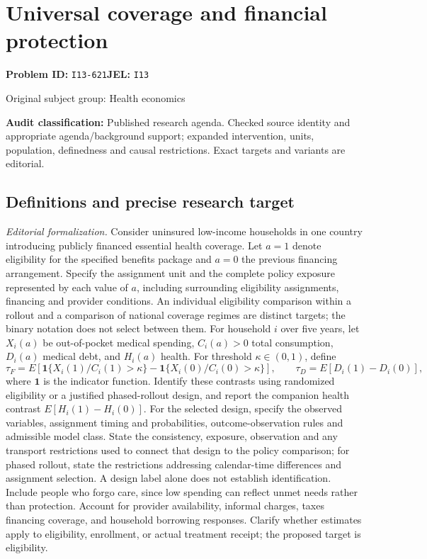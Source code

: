 \documentclass[11pt,a4paper]{article}
\begin{document}
\section*{Universal coverage and financial protection}
\textbf{Problem ID:} \texttt{I13-621}\quad \textbf{JEL:} \texttt{I13}\par
\label{problem:OP-0449}
{\sffamily\small\color{muted}Original subject group: Health economics\par}
\label{definitions:problem:30007731}
\textbf{Audit classification:} Published research agenda. Checked source identity and appropriate agenda/background support; expanded intervention, units, population, definedness and causal restrictions. Exact targets and variants are editorial.
\subsection*{Definitions and precise research target}
\textit{Editorial formalization.} Consider uninsured low-income households in one country introducing publicly financed essential health coverage. Let \(a=1\) denote eligibility for the specified benefits package and \(a=0\) the previous financing arrangement. Specify the assignment unit and the complete policy exposure represented by each value of \(a\), including surrounding eligibility assignments, financing and provider conditions. An individual eligibility comparison within a rollout and a comparison of national coverage regimes are distinct targets; the binary notation does not select between them. For household \(i\) over five years, let \(X_i(a)\) be out-of-pocket medical spending, \(C_i(a)>0\) total consumption, \(D_i(a)\) medical debt, and \(H_i(a)\) health. For threshold \(\kappa\in(0,1)\), define
\[\tau_F=E[\mathbf1\{X_i(1)/C_i(1)>\kappa\}-\mathbf1\{X_i(0)/C_i(0)>\kappa\}],\qquad\tau_D=E[D_i(1)-D_i(0)],\]
where \(\mathbf1\) is the indicator function. Identify these contrasts using randomized eligibility or a justified phased-rollout design, and report the companion health contrast \(E[H_i(1)-H_i(0)]\). For the selected design, specify the observed variables, assignment timing and probabilities, outcome-observation rules and admissible model class. State the consistency, exposure, observation and any transport restrictions used to connect that design to the policy comparison; for phased rollout, state the restrictions addressing calendar-time differences and assignment selection. A design label alone does not establish identification. Include people who forgo care, since low spending can reflect unmet needs rather than protection. Account for provider availability, informal charges, taxes financing coverage, and household borrowing responses. Clarify whether estimates apply to eligibility, enrollment, or actual treatment receipt; the proposed target is eligibility.
\end{document}
